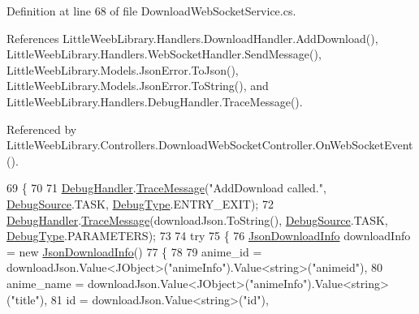 Definition at line 68 of file Download\+Web\+Socket\+Service.\+cs.



References Little\+Weeb\+Library.\+Handlers.\+Download\+Handler.\+Add\+Download(), Little\+Weeb\+Library.\+Handlers.\+Web\+Socket\+Handler.\+Send\+Message(), Little\+Weeb\+Library.\+Models.\+Json\+Error.\+To\+Json(), Little\+Weeb\+Library.\+Models.\+Json\+Error.\+To\+String(), and Little\+Weeb\+Library.\+Handlers.\+Debug\+Handler.\+Trace\+Message().



Referenced by Little\+Weeb\+Library.\+Controllers.\+Download\+Web\+Socket\+Controller.\+On\+Web\+Socket\+Event().


\begin{DoxyCode}
69         \{
70 
71             \mbox{\hyperlink{class_little_weeb_library_1_1_handlers_1_1_debug_handler}{DebugHandler}}.\mbox{\hyperlink{class_little_weeb_library_1_1_handlers_1_1_debug_handler_afccb37dfd6b2114af72000c2f4fe4607}{TraceMessage}}(\textcolor{stringliteral}{"AddDownload called."}, 
      \mbox{\hyperlink{namespace_little_weeb_library_1_1_handlers_a2a6ca0775121c9c503d58aa254d292be}{DebugSource}}.TASK, \mbox{\hyperlink{namespace_little_weeb_library_1_1_handlers_ab66019ed40462876ec4e61bb3ccb0a62}{DebugType}}.ENTRY\_EXIT);
72             \mbox{\hyperlink{class_little_weeb_library_1_1_handlers_1_1_debug_handler}{DebugHandler}}.\mbox{\hyperlink{class_little_weeb_library_1_1_handlers_1_1_debug_handler_afccb37dfd6b2114af72000c2f4fe4607}{TraceMessage}}(downloadJson.ToString(), 
      \mbox{\hyperlink{namespace_little_weeb_library_1_1_handlers_a2a6ca0775121c9c503d58aa254d292be}{DebugSource}}.TASK, \mbox{\hyperlink{namespace_little_weeb_library_1_1_handlers_ab66019ed40462876ec4e61bb3ccb0a62}{DebugType}}.PARAMETERS);
73                     
74             \textcolor{keywordflow}{try}
75             \{
76                 \mbox{\hyperlink{class_little_weeb_library_1_1_models_1_1_json_download_info}{JsonDownloadInfo}} downloadInfo = \textcolor{keyword}{new} 
      \mbox{\hyperlink{class_little_weeb_library_1_1_models_1_1_json_download_info}{JsonDownloadInfo}}()
77                 \{
78 
79                     anime\_id = downloadJson.Value<JObject>(\textcolor{stringliteral}{"animeInfo"}).Value<string>(\textcolor{stringliteral}{"animeid"}),
80                     anime\_name = downloadJson.Value<JObject>(\textcolor{stringliteral}{"animeInfo"}).Value<string>(\textcolor{stringliteral}{"title"}),
81                     \textcolor{keywordtype}{id} = downloadJson.Value<\textcolor{keywordtype}{string}>(\textcolor{stringliteral}{"id"}),

\end{DoxyCode}
